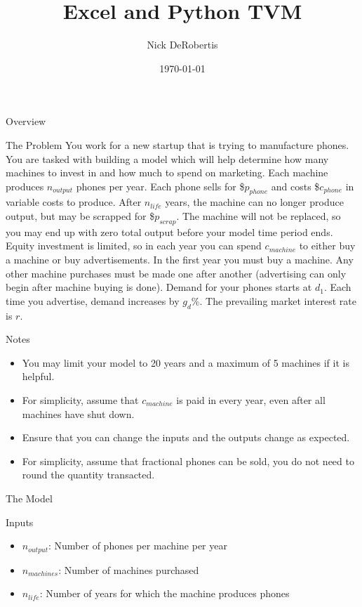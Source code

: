 \documentclass[]{article}
\begin{document}
\title{Excel and Python TVM}
\author{Nick DeRobertis}
\date{\today}
\maketitle
\begin{section}{Overview}
\begin{subsection}{The Problem}
You work for a new startup that is trying to manufacture phones. You are tasked with building a model which will help determine how many machines to invest in and how much to spend on marketing. Each machine produces $n_{output}$ phones per year. Each phone sells for \$$p_{phone}$ and costs \$$c_{phone}$ in variable costs to produce. After $n_{life}$ years, the machine can no longer produce output, but may be scrapped for \$$p_{scrap}$. The machine will not be replaced, so you may end up with zero total output before your model time period ends. Equity investment is limited, so in each year you can spend $c_{machine}$ to either buy a machine or buy advertisements. In the first year you must buy a machine. Any other machine purchases must be made one after another (advertising can only begin after machine buying is done). Demand for your phones starts at $d_1$. Each time you advertise, demand increases by $g_d$\%. The prevailing market interest rate is $r$.
\end{subsection}
\begin{subsection}{Notes}
\begin{itemize}
\item You may limit your model to 20 years and a maximum of 5 machines if it is helpful.
\item For simplicity, assume that $c_{machine}$ is paid in every year, even after all machines have shut down.
\item Ensure that you can change the inputs and the outputs change as expected.
\item For simplicity, assume that fractional phones can be sold, you do not need to round the quantity transacted.
\end{itemize}
\end{subsection}
\begin{subsection}{The Model}
\begin{subsubsection}{Inputs}
\begin{itemize}
\item $n_{output}$: Number of phones per machine per year
\item $n_{machines}$: Number of machines purchased
\item $n_{life}$: Number of years for which the machine produces phones

\end{itemize}
\end{subsubsection}
\end{subsection}
\end{section}
\end{document}
